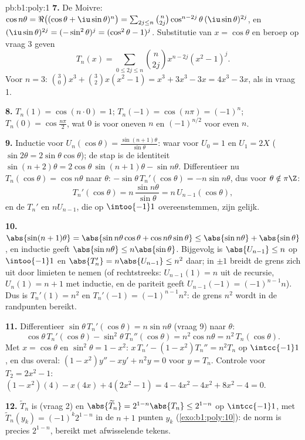 \begin{solution}{pb:b1:poly:1}
\textbf{7.} De Moivre: $\cos n\theta = \Re\bigl((\cos\theta +
\iu\sin\theta)^n\bigr) = \sum_{2j \leq n}\binom n{2j}
\cos^{n-2j}\theta\,(\iu\sin\theta)^{2j}$, en $(\iu\sin\theta)^{2j} =
(-\sin^2\theta)^j = (\cos^2\theta - 1)^j$. Substitutie van $x =
\cos\theta$ en beroep op vraag 3 geven
\[
T_n(x) = \sum_{0\leq 2j\leq n}\binom n{2j}x^{n-2j}(x^2 - 1)^j .
\]
Voor $n = 3$: $\binom30 x^3 + \binom32 x(x^2 - 1) = x^3 + 3x^3 - 3x = 4x^3
- 3x$, als in vraag 1.

\textbf{8.} $T_n(1) = \cos(n\cdot0) = 1$; $T_n(-1) = \cos(n\pi) =
(-1)^n$; $T_n(0) = \cos\frac{n\pi}2$, wat $0$ is voor oneven $n$ en
$(-1)^{n/2}$ voor even $n$.

\textbf{9.} Inductie voor $U_n(\cos\theta) =
\frac{\sin(n+1)\theta}{\sin\theta}$: waar voor $U_0 = 1$ en $U_1 = 2X$
($\sin2\theta = 2\sin\theta\cos\theta$); de stap is de identiteit
$\sin(n+2)\theta = 2\cos\theta\, \sin(n+1)\theta - \sin n\theta$.
Differentieer nu $T_n(\cos\theta) = \cos n\theta$ naar $\theta$:
$-\sin\theta\,T_n'(\cos\theta) = -n\sin n\theta$, dus voor $\theta \notin
\pi\Z$:
\[
T_n'(\cos\theta) = n\,\frac{\sin n\theta}{\sin\theta}
= n\,U_{n-1}(\cos\theta) ,
\]
en de  $T_n'$ en $nU_{n-1}$, die op $\intoo{-1}1$
overeenstemmen, zijn gelijk.

\textbf{10.} $\abs{\sin(n+1)\theta} = \abs{\sin n\theta\cos\theta + \cos
n\theta\sin\theta} \leq \abs{\sin n\theta} + \abs{\sin\theta}$, en
inductie geeft $\abs{\sin n\theta} \leq n\abs{\sin\theta}$. Bijgevolg is
$\abs{U_{n-1}} \leq n$ op $\intoo{-1}1$ en $\abs{T_n'} = n\abs{U_{n-1}}
\leq n^2$ daar; in $\pm1$ breidt de grens zich uit door limieten te nemen
(of rechtstreeks: $U_{n-1}(1) = n$ uit de recursie, $U_n(1) = n + 1$ met
inductie, en de pariteit geeft $U_{n-1}(-1) = (-1)^{n-1}n$). Dus is
$T_n'(1) = n^2$ en $T_n'(-1) = (-1)^{n-1}n^2$: de grens $n^2$ wordt in de
randpunten bereikt.

\textbf{11.} Differentieer $\sin\theta\,T_n'(\cos\theta) = n\sin n\theta$
(vraag 9) naar $\theta$:
\[
\cos\theta\,T_n'(\cos\theta) - \sin^2\theta\,T_n''(\cos\theta)
= n^2\cos n\theta = n^2\,T_n(\cos\theta) .
\]
Met $x = \cos\theta$ en $\sin^2\theta = 1 - x^2$: $x\,T_n' - (1 -
x^2)T_n'' = n^2T_n$ op $\intcc{-1}1$, en dus overal: $(1 - x^2)y'' - xy'
+ n^2y = 0$ voor $y = T_n$. Controle voor $T_2 = 2x^2 - 1$: $(1 -
x^2)(4) - x(4x) + 4(2x^2 - 1) = 4 - 4x^2 - 4x^2 + 8x^2 - 4 = 0$.

\textbf{12.} $\widetilde T_n$ is  (vraag 2) en $\abs{\widetilde
T_n} = 2^{1-n}\abs{T_n} \leq 2^{1-n}$ op $\intcc{-1}1$, met $\widetilde
T_n(y_k) = (-1)^k2^{1-n}$ in de $n + 1$ punten $y_k$
(\cref{exo:b1:poly:10}): de norm is precies $2^{1-n}$, bereikt met
afwisselende tekens.


\end{solution}
